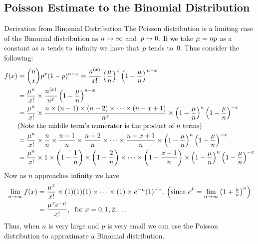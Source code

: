 \subsection{Poisson Estimate to the Binomial Distribution}
\begin{theory}{Derivation from Binomial Distribution}
The Poisson distribution is a limiting case of the Binomial distribution as $n \rightarrow \infty$ and~$p \rightarrow 0$. If we take $\mu = np$ as a constant as $n$ tends to~infinity we have that~$p$ tends to~0. Thus consider the following:
\begin{align*}
    f(x) &= \binom{n}{x} p^x (1-p)^{n-x} 
          = \frac{n^{(x)}}{x!} \left(\frac{\mu}{n}\right)^x \left(1-\frac{\mu}{n}\right)^{n-x} \\
         &= \frac{\mu^n}{x!} \times \frac{n^{(x)}}{n^x} \left(1-\frac{\mu}{n}\right)^{n-x} \\
         &= \frac{\mu^n}{x!} \times \frac{n \times (n-1) \times (n-2) \times \cdots \times (n-x+1)}{n^x} \times \left(1-\frac{\mu}{n}\right)^{n}\left(1-\frac{\mu}{n}\right)^{-x} \\
         &\text{(Note the middle term's numerator is the product of $n$ terms)} \\
         &= \frac{\mu^n}{x!} \times \frac{n}{n} \times \frac{n-1}{n} \times \frac{n-2}{n} \times \cdots \times \frac{n-x+1}{n} \times \left(1-\frac{\mu}{n}\right)^{n}\left(1-\frac{\mu}{n}\right)^{-x} \\
         &= \frac{\mu^n}{x!} \times 1 \times \left(1-\frac{1}{n}\right) \times \left(1-\frac{2}{n}\right) \times \cdots \times \left(1-\frac{x-1}{n}\right) \times \left(1-\frac{\mu}{n}\right)^{n}\left(1-\frac{\mu}{n}\right)^{-x} \\
\end{align*}
Now as $n$ approaches infinity we have
\begin{align*}
    \lim_{n \rightarrow \infty} f(x) 
    &= \frac{\mu^x}{x!}\times (1)(1)(1)\times\cdots\times(1) \times e^{-\mu} (1)^{-x}
    ,\:\left(\text{since } e^k = \lim_{n \rightarrow \infty}\left(1 + \textstyle\frac{k}{n}\right)^n\right) \\
    &= \frac{\mu^x e^{-\mu}}{x!},\:\text{ for } x = 0,1,2,\ldots
\end{align*}
Thus, when $n$ is very large and $p$ is very small we can use the Poisson distribution to approximate a Binomial distribution.
\end{theory}
